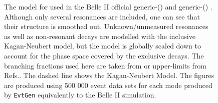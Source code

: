\begin{figure}[htbp!]
    \centering
    \caption{\label{fig:generic_Xs_model} The model for \BtoXsgamma used in the Belle II official generic-\Bp () and generic-\Bz () \MC.
    Although only several resonances are included, one can see that their structure is smoothed out.
    Unknown/unmeasured resonances as well as non-resonant decays are modelled with the inclusive Kagan-Neubert model, but the model is globally scaled down to account for the phase space covered by the exclusive decays.
    The branching fractions used here are taken from  or upper-limits from Refs.\cite{Workman:2022ynf,Amhis:2022mac}.
    The dashed line shows the Kagan-Neubert Model.
    The figures are produced using 500 000 event data sets for each mode produced by \texttt{EvtGen} equivalently to the Belle II simulation.
    }    
\end{figure}

